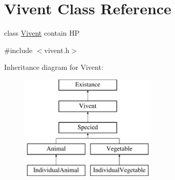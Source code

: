 \hypertarget{classVivent}{
\section{Vivent Class Reference}
\label{classVivent}
}


class \hyperlink{classVivent}{Vivent} contain HP  




{\ttfamily \#include $<$vivent.h$>$}

Inheritance diagram for Vivent:\begin{figure}[H]
\begin{center}
\leavevmode
\includegraphics[height=5.000000cm]{classVivent}
\end{center}
\end{figure}
